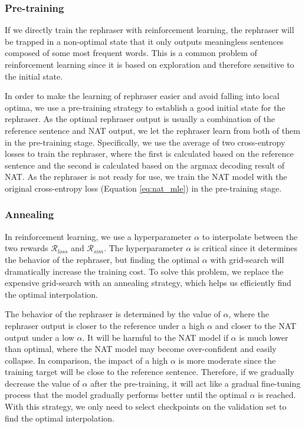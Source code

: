 \documentclass[letterpaper]{article} %
\begin{document}
\subsubsection{Pre-training}
If we directly train the rephraser with reinforcement learning, the rephraser will be trapped in a non-optimal state that it only outputs meaningless sentences composed of some most frequent words. This is a common problem of reinforcement learning since it is based on exploration and therefore sensitive to the initial state.

In order to make the learning of rephraser easier and avoid falling into local optima, we use a pre-training strategy to establish a good initial state for the rephraser. As the optimal rephraser output is usually a combination of the reference sentence and NAT output, we let the rephraser learn from both of them in the pre-training stage. Specifically, we use the average of two cross-entropy losses to train the rephraser, where the first is calculated based on the reference sentence and the second is calculated based on the argmax decoding result of NAT. As the rephraser is not ready for use, we train the NAT model with the original cross-entropy loss (Equation \ref{eq:nat_mle}) in the pre-training stage.

\subsubsection{Annealing}
In reinforcement learning, we use a hyperparameter $\alpha$ to interpolate between the two rewards $\mathcal{R}_{loss}$ and $\mathcal{R}_{sim}$. The hyperparameter $\alpha$ is critical since it determines the behavior of the rephraser, but finding the optimal $\alpha$ with grid-search will dramatically increase the training cost. To solve this problem, we replace the expensive grid-search with an annealing strategy, which helps us efficiently find the optimal interpolation.

The behavior of the rephraser is determined by the value of $\alpha$, where the rephraser output is closer to the reference under a high $\alpha$ and closer to the NAT output under a low $\alpha$. It will be harmful to the NAT model if $\alpha$ is much lower than optimal, where the NAT model may become over-confident and easily collapse. In comparison, the impact of a high $\alpha$ is more moderate since the training target will be close to the reference sentence. Therefore, if we gradually decrease the value of $\alpha$ after the pre-training, it will act like a gradual fine-tuning process that the model gradually performs better until the optimal $\alpha$ is reached. With this strategy, we only need to select checkpoints on the validation set to find the optimal interpolation.
\end{document}
